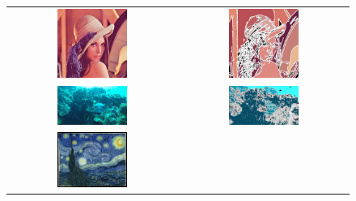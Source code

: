 \begin{figure}[ht]
    \begin{center}
    \begin{tabular}{ c c }
        \includegraphics[width=0.43\textwidth]{Figures/lena.jpg} &
        \includegraphics[width=0.43\textwidth]{Figures/lenaDA.jpg} \\
        \includegraphics[width=0.43\textwidth]{Figures/pufferfish6.jpg} &
        \includegraphics[width=0.43\textwidth]{Figures/pufferfishDA.jpg} \\
        \includegraphics[width=0.43\textwidth]{Figures/starry_night.jpg} &

\end{tabular}
\end{center}
\end{figure}
